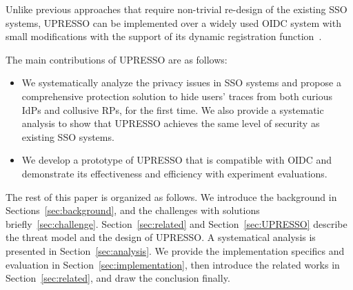 


Unlike previous approaches that require non-trivial re-design of the existing SSO systems, UPRESSO can be implemented over a widely used OIDC system with small modifications with the support of its dynamic registration function~\cite{DynamicRegistration}.









The main contributions of UPRESSO are as follows:
\begin{itemize}
\item We systematically analyze the privacy issues in SSO systems and propose a comprehensive protection solution to hide users' traces from both curious IdPs and collusive RPs, for the first time. We also provide a systematic analysis to show that UPRESSO achieves the same level of security as existing SSO systems.
\item We develop a prototype of UPRESSO that is compatible with OIDC and demonstrate its effectiveness and efficiency with experiment evaluations.
\end{itemize}



The rest of this paper is organized as follows. We introduce the background in Sections~\ref{sec:background}, and the challenges with solutions briefly~\ref{sec:challenge}. Section~\ref{sec:related} and Section~\ref{sec:UPRESSO} describe the threat model and the design of UPRESSO. A systematical analysis is presented in Section~\ref{sec:analysis}. We provide the implementation specifics and evaluation in Section~\ref{sec:implementation}, then introduce the related works in Section~\ref{sec:related}, and draw the conclusion finally.


